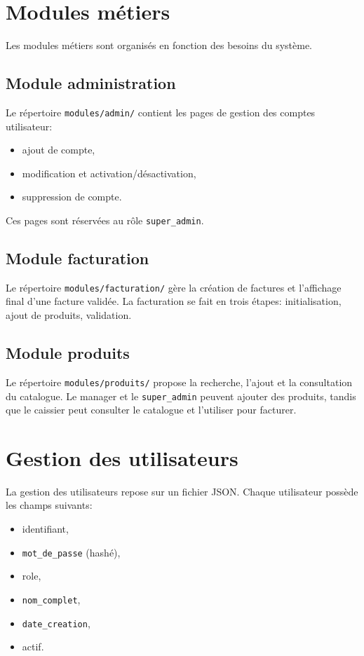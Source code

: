 \documentclass[12pt,a4paper]{article}
\begin{document}
\section{Modules métiers}
Les modules métiers sont organisés en fonction des besoins du système.

\subsection{Module administration}
Le répertoire \texttt{modules/admin/} contient les pages de gestion des comptes utilisateur:
\begin{itemize}
  \item ajout de compte,
  \item modification et activation/désactivation,
  \item suppression de compte.
\end{itemize}

Ces pages sont réservées au rôle \texttt{super\_admin}.

\subsection{Module facturation}
Le répertoire \texttt{modules/facturation/} gère la création de factures et l'affichage final d'une facture validée. La facturation se fait en trois étapes: initialisation, ajout de produits, validation.

\subsection{Module produits}
Le répertoire \texttt{modules/produits/} propose la recherche, l'ajout et la consultation du catalogue. Le manager et le \texttt{super\_admin} peuvent ajouter des produits, tandis que le caissier peut consulter le catalogue et l'utiliser pour facturer.

\section{Gestion des utilisateurs}
La gestion des utilisateurs repose sur un fichier JSON. Chaque utilisateur possède les champs suivants:
\begin{itemize}
  \item identifiant,
  \item \texttt{mot\_de\_passe} (hashé),
  \item role,
  \item \texttt{nom\_complet},
  \item \texttt{date\_creation},
  \item actif.
\end{itemize}
\end{document}
